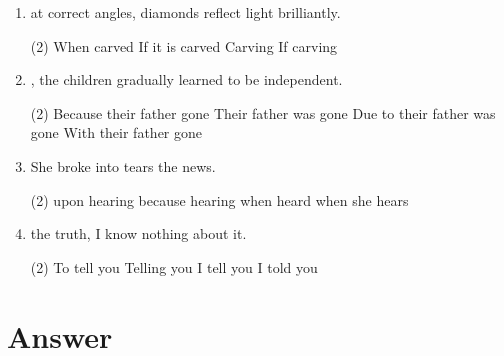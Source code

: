 \begin{enumerate}
\item \ttu at correct angles, diamonds reflect light brilliantly.
\begin{tasks}(2)
  \task When carved
  \task If it is carved
  \task Carving
  \task If carving
\end{tasks}

\item \ttu, the children gradually learned to be independent.
\begin{tasks}(2)
  \task Because their father gone
  \task Their father was gone
  \task Due to their father was gone
  \task With their father gone
\end{tasks}

\item She broke into tears \ttu the news.
\begin{tasks}(2)
  \task upon hearing
  \task because hearing
  \task when heard
  \task when she hears
\end{tasks}

\item \ttu the truth, I know nothing about it.
\begin{tasks}(2)
  \task To tell you
  \task Telling you
  \task I tell you
  \task I told you
\end{tasks}

\end{enumerate}

\section{Answer}

